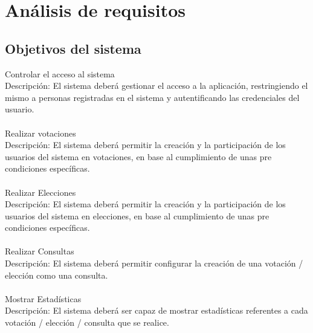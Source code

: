 \documentclass[12pt,letterpaper]{report}
\begin{document}
\section{Análisis de requisitos}

	\subsection{Objetivos del sistema}
		\noindent Controlar el acceso al sistema\\
		Descripción: El sistema deberá gestionar el acceso a la aplicación, restringiendo el mismo a personas registradas en el sistema y autentificando las credenciales del usuario.
		\\~\\
		Realizar votaciones\\
		Descripción: El sistema deberá permitir la creación y la participación de los usuarios del sistema en votaciones, en base al cumplimiento de unas pre condiciones específicas.
		\\~\\
		Realizar Elecciones \\
		Descripción: 
		El sistema deberá permitir la creación y la participación de los usuarios del sistema en elecciones, en base al cumplimiento de unas pre condiciones específicas.
		\\~\\ 
		Realizar Consultas\\
		Descripción: El sistema deberá permitir configurar la creación de una votación / elección como una consulta.
		\\~\\  
		Mostrar Estadísticas\\
		Descripción: El sistema deberá ser capaz de mostrar estadísticas referentes a cada votación / elección / consulta que se realice.\\   
		
\end{document}

